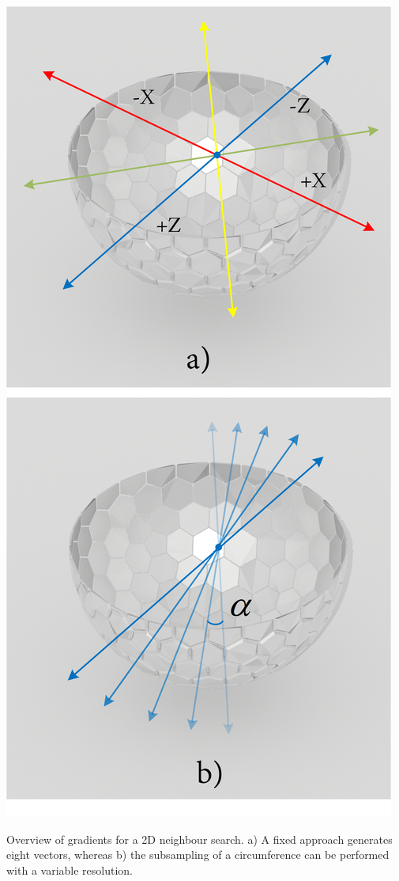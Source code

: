 \begin{marginfigure}[.cm]
    \centering
    \includegraphics[width=\linewidth]{figs/lidar_optimization/neighbour_search.png}
	\caption{Overview of gradients for a 2D neighbour search. a) A fixed approach generates eight vectors, whereas b) the subsampling of a circumference can be performed with a variable resolution.}
	\label{fig:neighbour_search}
\end{marginfigure}
